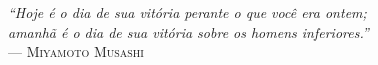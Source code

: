 \newpage
\begin{flushright}
    \mbox{}\vfill
    {\sffamily\itshape
        ``Hoje é o dia de sua vitória perante o que você era ontem;\\ 
        amanhã é o dia de sua vitória sobre os homens inferiores.''\\}
        --- \textsc{Miyamoto Musashi}
\end{flushright}
